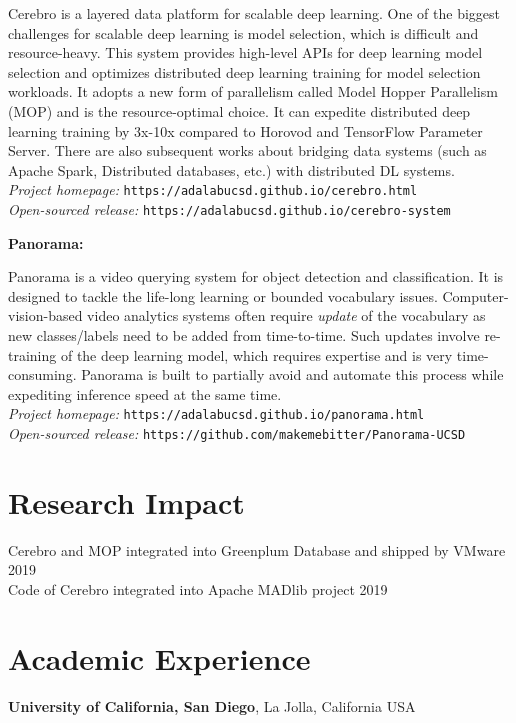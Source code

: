 \documentclass[margin,line]{res}
\begin{document}
\begin{resume}
Cerebro is a layered data platform for scalable deep learning. One of the biggest challenges for scalable deep learning is model selection, which is difficult and resource-heavy. This system provides high-level APIs for deep learning model selection and optimizes distributed deep learning training for model selection workloads. It adopts a new form of parallelism called Model Hopper Parallelism (MOP) and is the resource-optimal choice. It can expedite distributed deep learning training by 3x-10x compared to Horovod and TensorFlow Parameter Server. There are also subsequent works about bridging data systems (such as Apache Spark, Distributed databases, etc.) with distributed DL systems.\\
\textit{Project homepage: }\texttt{https://adalabucsd.github.io/cerebro.html}\\
\textit{Open-sourced release: }\texttt{https://adalabucsd.github.io/cerebro-system}

\newpage
{\bf Panorama:}

Panorama is a video querying system for object detection and classification. It is designed to tackle the life-long learning or bounded vocabulary issues. Computer-vision-based video analytics systems often require \textit{update} of the vocabulary as new classes/labels need to be added from time-to-time. Such updates involve re-training of the deep learning model, which requires expertise and is very time-consuming. Panorama is built to partially avoid and automate this process while expediting inference speed at the same time.\\
\textit{Project homepage: }\texttt{https://adalabucsd.github.io/panorama.html}\\
\textit{Open-sourced release: }\texttt{https://github.com/makemebitter/Panorama-UCSD}

\section{\sc Research Impact}
Cerebro and MOP integrated into Greenplum Database and shipped by VMware \hfill 2019\\
Code of Cerebro integrated into Apache MADlib project \hfill 2019\\

\section{\sc Academic Experience}
{\bf University of California, San Diego}, La Jolla, California USA


\end{resume}
\end{document}
